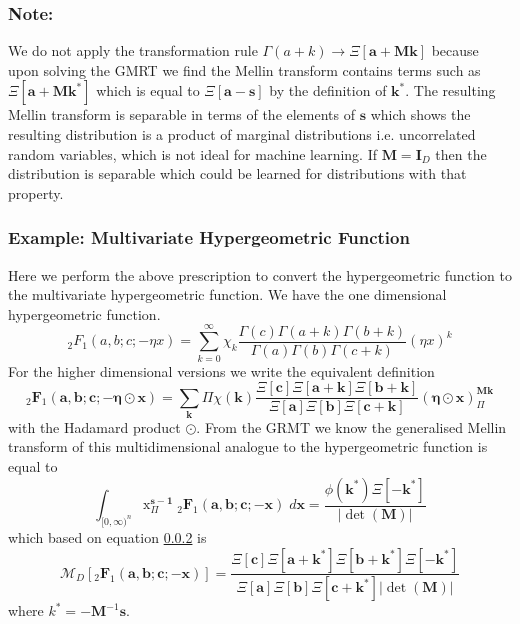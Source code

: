 \documentclass{article}
\begin{document}
\subsubsection{Note:}
We do not apply the transformation rule $\Gamma(a+k) \to \Xi[\mathbf{a} + \mathbf{Mk}]$ because upon solving the GMRT we find the Mellin transform contains terms such as $\Xi[\mathbf{a} + \mathbf{Mk^*}]$ which is equal to $\Xi[\mathbf{a} - \mathbf{s}]$ by the definition of $\mathbf{k}^*$. The resulting Mellin transform is separable in terms of the elements of $\mathbf{s}$ which shows the resulting distribution is a product of marginal distributions i.e. uncorrelated random variables, which is not ideal for machine learning. If $\mathbf{M}=\mathbf{I}_D$ then the distribution is separable which could be learned for distributions with that property.

\subsubsection{Example: Multivariate Hypergeometric Function}
Here we perform the above prescription to convert the hypergeometric function to the multivariate hypergeometric function. We have the one dimensional hypergeometric function.
\begin{equation}
_2F_1(a,b;c;-\eta x) = \sum_{k=0}^\infty \chi_k \frac{\Gamma(c)\Gamma(a+k)\Gamma(b+k)}{\Gamma(a)\Gamma(b)\Gamma(c+k)} (\eta x)^k
\end{equation}
For the higher dimensional versions we write the equivalent definition
\begin{equation}
_2\mathbf{F}_1(\mathbf{a},\mathbf{b};\mathbf{c};-\boldsymbol\eta\odot\mathbf{x}) = \sum_{\mathbf{k}}\Pi\chi(\mathbf{k})\frac{\Xi[\mathbf{c}]\Xi[\mathbf{a}+\mathbf{k}]\Xi[\mathbf{b}+\mathbf{k}]}{\Xi[\mathbf{a}]\Xi[\mathbf{b}]\Xi[\mathbf{c}+\mathbf{k}]}{(\boldsymbol\eta\odot\mathbf{x})}^{\mathbf{M}\mathbf{k}}_\Pi
\end{equation}
with the Hadamard product $\odot$. From the GRMT we know the generalised Mellin transform of this multidimensional analogue to the hypergeometric function is equal to
\begin{equation}
\int_{[0,\infty)^n}\mathrm{x}^{\mathbf{s-1}}_\Pi\;_2\mathbf{F}_1(\mathbf{a},\mathbf{b};\mathbf{c};-\mathbf{x})\; d\mathbf{x} = \frac{\phi(\mathbf{k}^*)\Xi[-\mathbf{k}^*]}{|\det(\mathbf{M})|}
\end{equation}
which based on equation \ref{} is \begin{equation}
\mathcal{M}_D[_2\mathbf{F}_1(\mathbf{a},\mathbf{b};\mathbf{c};-\mathbf{x})] = \frac{\Xi[\mathbf{c}]\Xi[\mathbf{a}+\mathbf{k}^*]\Xi[\mathbf{b}+\mathbf{k}^*]\Xi[-\mathbf{k}^*]}{\Xi[\mathbf{a}]\Xi[\mathbf{b}]\Xi[\mathbf{c}+\mathbf{k}^*]|\det(\mathbf{M})|}
\end{equation}
where $k^* = -\mathbf{M}^{-1}\mathbf{s}$.
\end{document}
